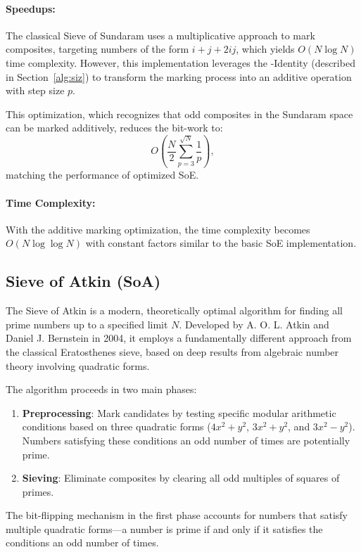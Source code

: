 \documentclass{article}
\begin{document}
\paragraph{Speedups:}
The classical Sieve of Sundaram uses a multiplicative approach to mark composites, targeting numbers of the form $i + j + 2ij$, which yields $O(N \log N)$ time complexity. However, this implementation leverages the \Xp-Identity (described in Section~\ref{alg:siz}) to transform the marking process into an additive operation with step size $p$.

This optimization, which recognizes that odd composites in the Sundaram space can be marked additively, reduces the bit-work to:
\[
O\left(\frac{N}{2}\sum_{p=3}^{\sqrt N}\frac{1}{p}\right),
\]
matching the performance of optimized SoE.

\paragraph{Time Complexity:} With the additive marking optimization, the time complexity becomes $O(N \log \log N)$ with constant factors similar to the basic SoE implementation.

\subsection{Sieve of Atkin (SoA)} \label{alg:soa}

The Sieve of Atkin is a modern, theoretically optimal algorithm for finding all prime numbers up to a specified limit $N$. Developed by A. O. L. Atkin and Daniel J. Bernstein in 2004, it employs a fundamentally different approach from the classical Eratosthenes sieve, based on deep results from algebraic number theory involving quadratic forms.

The algorithm proceeds in two main phases:
\begin{enumerate}[noitemsep]
    \item \textbf{Preprocessing}: Mark candidates by testing specific modular arithmetic conditions based on three quadratic forms ($4x^2 + y^2$, $3x^2 + y^2$, and $3x^2 - y^2$). Numbers satisfying these conditions an odd number of times are potentially prime.
    \item \textbf{Sieving}: Eliminate composites by clearing all odd multiples of squares of primes.
\end{enumerate}

The bit-flipping mechanism in the first phase accounts for numbers that satisfy multiple quadratic forms—a number is prime if and only if it satisfies the conditions an odd number of times.
\end{document}
